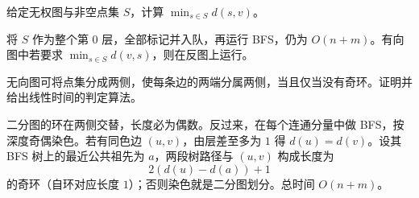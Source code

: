 \begin{example}[多源 BFS]
    给定无权图与非空点集 $S$，计算 $\min_{s\in S}d(s,v)$。
\end{example}
\begin{solution}
    将 $S$ 作为整个第 $0$ 层，全部标记并入队，再运行 BFS，仍为 $O(n+m)$。有向图中若要求 $\min_{s\in S}d(v,s)$，则在反图上运行。
\end{solution}

\begin{exercise}[二分图与奇环]
    无向图可将点集分成两侧，使每条边的两端分属两侧，当且仅当没有奇环。证明并给出线性时间的判定算法。
\end{exercise}
\begin{solution}
    二分图的环在两侧交替，长度必为偶数。反过来，在每个连通分量中做 BFS，按深度奇偶染色。若有同色边 $(u,v)$，由层差至多为 $1$ 得 $d(u)=d(v)$。设其 BFS 树上的最近公共祖先为 $a$，两段树路径与 $(u,v)$ 构成长度为
    \[
        2(d(u)-d(a))+1
    \]
    的奇环（自环对应长度 $1$）；否则染色就是二分图划分。总时间 $O(n+m)$。
\end{solution}

